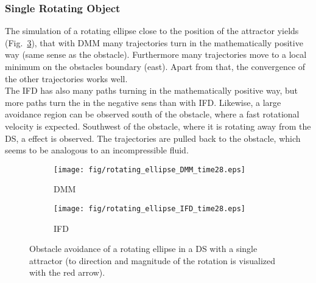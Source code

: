 \subsubsection{Single Rotating Object}
The simulation of a rotating ellipse close to the position of the attractor yields (Fig.~\ref{fig:rotating_circle_fig}), that with DMM many trajectories turn in the mathematically positive way (same sense as the obstacle). Furthermore many trajectories move to a local minimum on the obstacles boundary (east). Apart from that, the convergence of the other trajectories works well. \\
The IFD has also many paths turning in the mathematically positive way, but more paths turn the in the negative sens than with IFD. Likewise, a large avoidance region can be observed south of the obstacle, where a fast rotational velocity is expected. Southwest of the obstacle, where it is rotating away from the DS, a  effect is observed. The trajectories are pulled back to the obstacle, which seems to be analogous to an incompressible fluid. \\
\begin{figure}[tb]\centering
\begin{subfigure}{.48\columnwidth} %
\centering
\texttt{[image: fig/rotating\_ellipse\_DMM\_time28.eps]}
\caption{DMM}
\label{fig:rotating_ellipse_DMM_time0}
\end{subfigure}%
\begin{subfigure}{.48\columnwidth} %
\centering
\texttt{[image: fig/rotating\_ellipse\_IFD\_time28.eps]}
\caption{IFD}
\label{fig:rotating_ellipse_IFD_time0}
\end{subfigure}
\caption{Obstacle avoidance of a rotating ellipse in a DS with a single attractor (to direction and magnitude of the rotation is visualized with the red arrow).}
\label{fig:rotating_circle_fig}
\end{figure}

